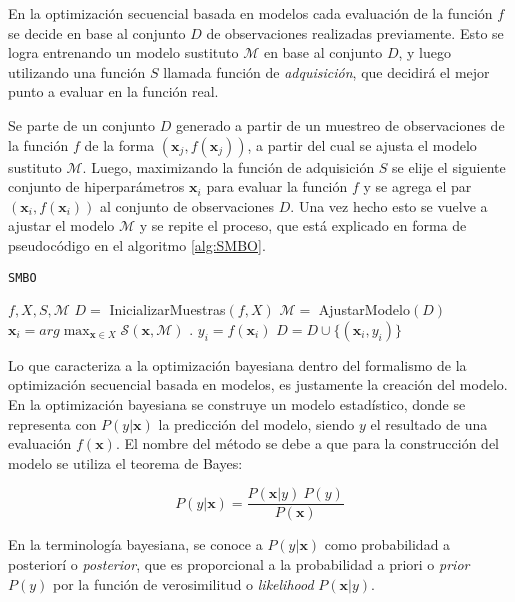 En la optimización secuencial basada en modelos cada evaluación de la función $f$ se decide en base al conjunto $D$ de observaciones realizadas previamente. Esto se logra entrenando un modelo sustituto $\mathcal{M}$ en base al conjunto $D$, y luego utilizando una función $S$ llamada función de \textit{adquisición}, que decidirá el mejor punto a evaluar en la función real.

Se parte de un conjunto $D$ generado a partir de un muestreo de observaciones de la función $f$ de la forma $(\textbf{x}_j, f(\textbf{x}_j))$, a partir del cual se ajusta el modelo sustituto $\mathcal{M}$. Luego, maximizando la función de adquisición $S$ se elije el siguiente conjunto de hiperparámetros $\textbf{x}_i$ para evaluar la función $f$ y se agrega el par $(\textbf{x}_i, f(\textbf{x}_i))$ al conjunto de observaciones $D$. Una vez hecho esto se vuelve a ajustar el modelo $\mathcal{M}$ y se repite el proceso, que está explicado en forma de pseudocódigo en el algoritmo \ref{alg:SMBO}.


\begin{algorithm}
\caption{\texttt{SMBO}}
\label{alg:SMBO}
\begin{algorithmic}[1]
\Require $f, X, S,\mathcal{M}$
\State $D =$ InicializarMuestras$(f, X)$
\vspace{1mm}
	\State $\mathcal{M} =$ AjustarModelo$(D)$
	\State $\textbf{x}_{i} = arg \max_{\textbf{x}\in X} \mathcal{S}(\textbf{x}, \mathcal{M})$ .
	\State $y_i = f(\textbf{x}_i)$	
	\State $D = D \cup \{(\textbf{x}_i, y_i)\}$
\EndFor
\vspace{3mm}

\end{algorithmic}
\end{algorithm}




Lo que caracteriza a la optimización bayesiana dentro del formalismo de la optimización secuencial basada en modelos, es justamente la creación del modelo.
En la optimización bayesiana se construye un modelo estadístico, donde se representa con  $P(y|\textbf{x})$ la predicción del modelo, siendo $y$ el resultado de una evaluación $f(\textbf{x})$. El nombre del método se debe a que para la construcción del modelo se utiliza el teorema de Bayes:
  
 \[
 P(y|\textbf{x}) = \frac{P(\textbf{x}|y) \ P(y)}{P(\textbf{x})}
 \]
 
 En la terminología bayesiana, se conoce a $P(y|\textbf{x})$ como probabilidad a posteriorí o \textit{posterior}, que es proporcional a la probabilidad a priori o \textit{prior} $P(y)$ por la función de verosimilitud o \textit{likelihood} $P(\textbf{x}|y)$.
 

